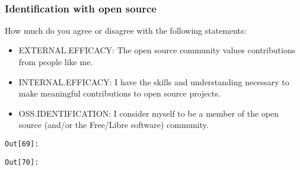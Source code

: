 \documentclass[11pt]{article}
\providecommand{\tightlist}{%
      \setlength{\itemsep}{0pt}\setlength{\parskip}{0pt}}
\begin{document}
    


    \begin{center}
    \end{center}
    { \hspace*{\fill} \\}
    

    \subsubsection{Identification with open
source}\label{identification-with-open-source}

How much do you agree or disagree with the following statements:

\begin{itemize}
\tightlist
\item
  EXTERNAL.EFFICACY: The open source community values contributions from
  people like me.
\item
  INTERNAL.EFFICACY: I have the skills and understanding necessary to
  make meaningful contributions to open source projects.
\item
  OSS.IDENTIFICATION: I consider myself to be a member of the open
  source (and/or the Free/Libre software) community.
\end{itemize}


\texttt{\color{outcolor}Out[{\color{outcolor}69}]:}
    

    

\texttt{\color{outcolor}Out[{\color{outcolor}70}]:}
    
\end{document}
